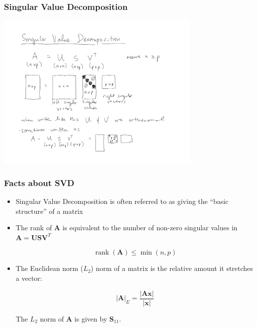 \documentclass{beamer}
\newcommand{\Mtx}[1]{\ensuremath{\mathbf{#1}}}
\DeclareMathOperator{\rank}{rank}
\begin{document}
\begin{frame}
  \frametitle{Singular Value Decomposition}



\begin{center}
\includegraphics[height=3in]{svd-graphic}
\end{center}

\end{frame}


\begin{frame}
  \frametitle{Facts about SVD}

\begin{itemize}
\item Singular Value Decomposition is often referred to as giving the ``basic structure'' of a matrix

\item The rank of $\Mtx{A}$ is equivalent to the number of non-zero singular values in $ \Mtx{A} = \Mtx{U}\Mtx{S}\Mtx{V}^T $

$$ \rank(\Mtx{A}) \leq \min(n,p) $$


\item  The Euclidean norm ($L_2$) norm of a matrix is the relative amount it stretches a vector:

$$ |\Mtx{A}|_E = \frac{|\Mtx{A}\Mtx{x}|}{|\Mtx{x}|} $$

The $L_2$ norm of $\Mtx{A}$ is given by $\Mtx{S}_{11}$.
\end{itemize}



\end{frame}
\end{document}

